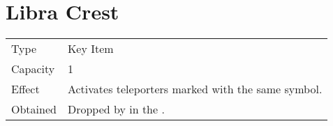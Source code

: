 \section{Libra Crest}
\label{item:libra_crest}


\noindent\begin{tabularx}{\textwidth}[l]{lX}
	Type
	& Key Item
\\ %
	Capacity
	& 1
\\ %
	Effect
	& Activates teleporters marked with the same symbol.
\\ %
	Obtained
	& Dropped by \nameref{monster:squidite} in the \nameref{map:wintry_cave}.
\end{tabularx}
